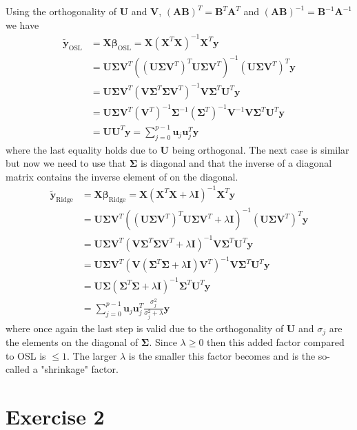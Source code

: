 \documentclass{article}
\begin{document}
\begin{enumerate}[a)]
		Using the orthogonality of $\bm U$ and $\bm V$, $(\bm{AB})^T=\bm B^T\bm A^T$ and $(\bm{AB})^{-1}=\bm B^{-1}\bm A^{-1}$ we have
		\begin{align*}
			\tilde{\bm{y}}_\text{OSL}&=\bm{X\beta}_\text{OSL}=\bm{X}(\bm{X}^T\bm{X})^{-1}\bm{X}^T\bm{y}\\
			&=\bm{U\Sigma V}^T((\bm{U\Sigma V}^T)^T\bm{U\Sigma V}^T)^{-1}(\bm{U\Sigma V}^T)^T\bm{y}\\
			&=\bm{U\Sigma V}^T(\bm{V}\bm{\Sigma}^T\bm{\Sigma}\bm{V}^T)^{-1}\bm{V}\bm{\Sigma}^T\bm{U}^T\bm{y}\\
			&=\bm{U\Sigma V}^T(\bm{V}^T)^{-1}\bm{\Sigma}^{-1}(\bm{\Sigma}^T)^{-1}\bm{V}^{-1}\bm{V}\bm{\Sigma}^T\bm{U}^T\bm{y}\\
			&=\bm{U}\bm{U}^T\bm{y}=\sum_{j=0}^{p-1}\bm{u}_j\bm{u}_j^T\bm{y}
		\end{align*}
		where the last equality holds due to $\bm U$ being orthogonal. The next case is similar but now we need to use that $\bm\Sigma$ is diagonal and that the inverse of a diagonal matrix contains the inverse element of on the diagonal.
		\begin{align*}
			\tilde{\bm{y}}_\text{Ridge}&=\bm{X\beta}_\text{Ridge}=\bm{X}(\bm{X}^T\bm{X}+\lambda\bm I)^{-1}\bm{X}^T\bm{y}\\
			&=\bm{U\Sigma V}^T((\bm{U\Sigma V}^T)^T\bm{U\Sigma V}^T+\lambda\bm I)^{-1}(\bm{U\Sigma V}^T)^T\bm{y}\\
			&=\bm{U\Sigma V}^T(\bm{V}\bm{\Sigma}^T\bm{\Sigma}\bm{V}^T+\lambda\bm I)^{-1}\bm{V}\bm{\Sigma}^T\bm{U}^T\bm{y}\\
			&=\bm{U\Sigma V}^T(\bm{V}({\bm\Sigma}^T\bm{\Sigma}+\lambda\bm I)\bm{V}^T)^{-1}\bm{V}\bm{\Sigma}^T\bm{U}^T\bm{y}\\
			&=\bm{U\Sigma }({\bm\Sigma}^T\bm{\Sigma}+\lambda\bm I)^{-1}\bm{\Sigma}^T\bm{U}^T\bm{y}\\
			&=\sum_{j=0}^{p-1}\bm{u}_j\bm{u}_j^T\frac{\sigma_j^2}{\sigma_j^2+\lambda}\bm{y}
		\end{align*}
		where once again the last step is valid due to the orthogonality of $\bm U$ and $\sigma_j$ are the elements on the diagonal of $\bm\Sigma$. Since $\lambda\geq0$ then this added factor compared to OSL is $\leq1$. The larger $\lambda$ is the smaller this factor becomes and is the so-called a "shrinkage" factor. 
	\end{enumerate}
	
	\section*{Exercise 2}
	
	
\end{document}
